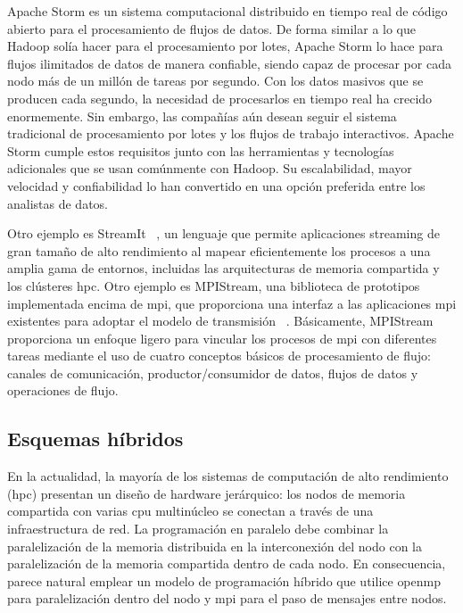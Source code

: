 Apache Storm\cite{iqbal2015big} es un sistema computacional distribuido en tiempo real de código abierto para el procesamiento de flujos de datos. De forma similar a lo que Hadoop \cite{white2012hadoop} solía hacer para el procesamiento por lotes, Apache Storm lo hace para flujos ilimitados de datos de manera confiable, siendo capaz de procesar por cada nodo más de un millón de tareas por segundo. Con los datos masivos que se producen cada segundo, la necesidad de procesarlos en tiempo real ha crecido enormemente. Sin embargo, las compañías aún desean seguir el sistema tradicional de procesamiento por lotes y los flujos de trabajo interactivos. Apache Storm cumple estos requisitos junto con las herramientas y tecnologías adicionales que se usan comúnmente con Hadoop. Su escalabilidad, mayor velocidad y confiabilidad lo han convertido en una opción preferida entre los analistas de datos.

Otro ejemplo es StreamIt ~\cite{Thies2002}, un lenguaje que permite aplicaciones streaming de gran tamaño de alto rendimiento al mapear eficientemente los procesos a una amplia gama de entornos, incluidas las arquitecturas de memoria compartida y los clústeres \acrshort{hpc}. Otro ejemplo es MPIStream, una biblioteca de prototipos implementada encima de \acrshort{mpi}, que proporciona una interfaz a las aplicaciones \acrshort{mpi} existentes para adoptar el modelo de transmisión ~\cite{peng2017,Peng:2015}. Básicamente, MPIStream proporciona un enfoque ligero para vincular los procesos de \acrshort{mpi} con diferentes tareas mediante el uso de cuatro conceptos básicos de procesamiento de flujo: canales de comunicación, productor/consumidor de datos, flujos de datos y operaciones de flujo.

\subsection{Esquemas híbridos}
\label{sec:frameworks_esquemas_hibridos}

En la actualidad, la mayoría de los sistemas de computación de alto rendimiento (\acrshort{hpc}) presentan un diseño de hardware jerárquico: los nodos de memoria compartida con varias \acrshort{cpu} multinúcleo se conectan a través de una infraestructura de red. La programación en paralelo debe combinar la paralelización de la memoria distribuida en la interconexión del nodo con la paralelización de la memoria compartida dentro de cada nodo. En consecuencia, parece natural emplear un modelo de programación híbrido que utilice \acrshort{openmp} para paralelización dentro del nodo y \acrshort{mpi} para el paso de mensajes entre nodos.

